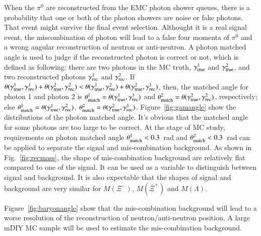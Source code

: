 When the $\pi^0$ are reconstructed from the EMC photon shower queues, there 
is a probability that one or both of the photon showers are noise or fake
photons. That event might survive the final event selection. Althought it is a 
real signal event, the miscombination of photon will lead to a false four
momenta of $\pi^0$ and a wrong angular reconstruction of neutron or anti-neutron.
A photon matched angle is used to judge if the reconstructed photon is
correct or not, which is defined as following: there are two photons in the MC 
truth, $\gamma^1_{\rm true}$ and $\gamma^2_{\rm true}$, and two reconstructed
photons $\gamma^1_{\rm rec}$ and $\gamma^2_{\rm rec}$. If $\theta(\gamma^1_{\rm true},
\gamma^1_{\rm rec}) + \theta( \gamma^2_{\rm true} , \gamma^2_{\rm rec}) < 
\theta(\gamma^1_{\rm true}, \gamma^2_{\rm rec}) + \theta( \gamma^2_{\rm true} , 
\gamma^1_{\rm rec})$, then, the matched angle for photon 1 and photon 2 is 
$\theta^1_{\rm match} = \theta(\gamma^1_{\rm true}, \gamma^1_{\rm rec})$ and
$\theta^2_{\rm match} = \theta(\gamma^2_{\rm true}, \gamma^2_{\rm rec})$, 
respectively; else 
$\theta^1_{\rm match} = \theta(\gamma^1_{\rm true}, \gamma^2_{\rm rec})$,
$\theta^2_{\rm match} = \theta(\gamma^2_{\rm true}, \gamma^1_{\rm rec})$.
Figure~\ref{fig:gamangle} show the distributions of the photon matched angle.
It's obvious that the matched angle for some photons are too large to be 
correct. At the stage of MC study, requirements on photon matched angle
$\theta^1_{\rm match} < 0.3$~rad and $\theta^2_{\rm match} < 0.3$~rad can
be applied to separate the signal and mis-combination background. As shown
in Fig.~\ref{fig:recmass}, the shape of mis-combination background are relatively 
flat compared to one of the signal. It can be used as a variable to distinguish
between signal and background. It is also expectable that the shapes of 
signal and background are very similar for $M(\Xi^-)$, $M(\bar{\Xi}^+)$
and $M(\Lambda)$.

Figure~\ref{fig:baryonangle} show that the mis-combination background will 
lead to a worse resolution of the reconstruction of neutron/anti-neutron 
position. A large mDIY MC sample will be used to estimate the mis-combination
background.
